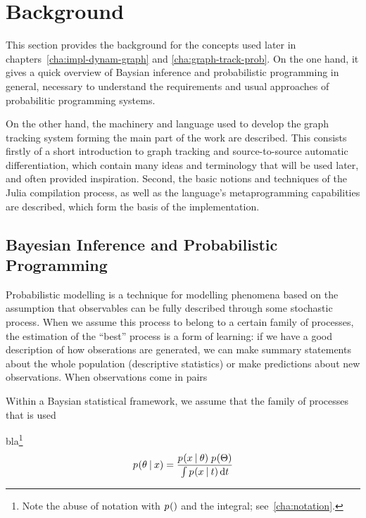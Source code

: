 \chapter{Background}
\label{cha:background}

This section provides the background for the concepts used later in
chapters~\ref{cha:impl-dynam-graph} and \ref{cha:graph-track-prob}.  On the one hand, it gives a
quick overview of Baysian inference and probabilistic programming in general, necessary to
understand the requirements and usual approaches of probabilitic programming systems.

On the other hand, the machinery and language used to develop the graph tracking system forming the
main part of the work are described.  This consists firstly of a short introduction to graph
tracking and source-to-source automatic differentiation, which contain many ideas and terminology
that will be used later, and often provided inspiration.  Second, the basic notions and techniques
of the Julia compilation process, as well as the language's metaprogramming capabilities are
described, which form the basis of the implementation.


\section{Bayesian Inference and Probabilistic Programming}
\label{sec:bayes-infer-prob}

Probabilistic modelling is a technique for modelling phenomena based on the assumption that
observables can be fully described through some stochastic process.  When we assume this process to
belong to a certain family of processes, the estimation of the \enquote{best} process is a form of
learning: if we have a good description of how obserations are generated, we can make summary
statements about the whole population (descriptive statistics) or make predictions about new
observations.  When observations come in pairs

Within a Baysian statistical framework, we assume that the family of processes that is used


bla\footnote{Note the abuse of notation with \(\prob{}\) and the integral; see~\ref{cha:notation}.}
\begin{equation}
  \prob{\theta \given x} = \frac{\prob{x \given \theta}\; \prob{\Theta}}{\int \prob{x \given
    t} \dif t}
\end{equation}

